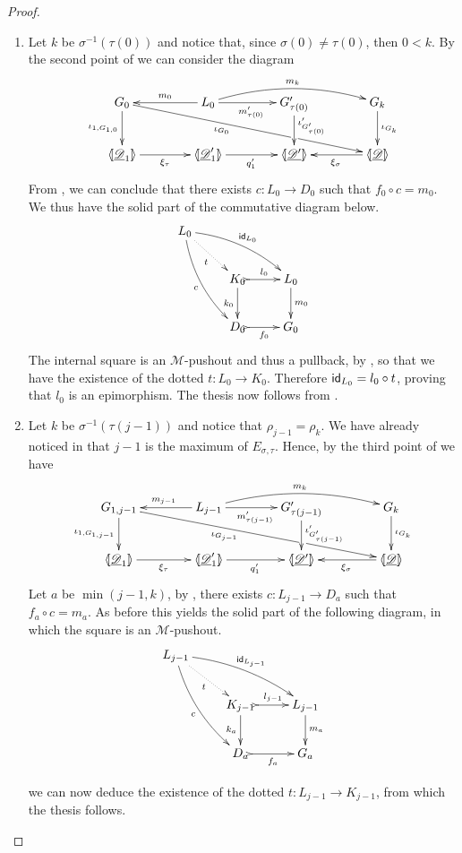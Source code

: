 \begin{proof}
	\begin{enumerate}
		\item Let $k$ be $\sigma^{-1}(\tau(0))$ and notice that, since $\sigma(0)\neq \tau(0)$, then $0< k$.  By  the second point of   we can consider the diagram
		\[\xymatrix@C=40pt{G_{0} \ar[drrr]_(.4){\iota_{G_0}}|(.675)\hole \ar[d]_{\iota_{1,G_{1,0}}}& L_0 \ar[r]_{m'_{\tau(0)}} \ar@/^.4cm/[rr]^{m_{k}} \ar[l]_{m_{0}} &G'_{\tau(0)} \ar[d]^(.45){\iota'_{G'_{\tau(0)}}} & G_{k} \ar[d]^{\iota_{G_k}}\\ \lpro\der{D}_1 \rpro \ar[r]_{\xi_{\tau}} &\lpro \der{D}'_1\rpro \ar[r]_{q'_1} & \lpro \der{D'}\rpro & \tpro{D} \ar[l]^{\xi_{\sigma}}}\]
		From , we can conclude that there exists $c\colon L_0\to D_0$ such that $f_0\circ c=m_0$. We thus have the solid part of the commutative diagram below.
		\[\xymatrix{L_0 \ar@/^.3cm/[drr]^{\id{L_0}} \ar@{.>}[dr]_{t} \ar@/_.3cm/[ddr]_{c}\\ & K_0 \ar[d]_{k_0}\ar@{>->}[r]^{l_0}& L_0 \ar[d]^{m_0} \\& D_0 \ar@{>->}[r]_{f_0} & G_0} \]
		The internal square is an $\mathcal{M}$-pushout and thus a pullback, by , so that we have the existence of the dotted $t\colon L_0\to K_0$. Therefore $\mathsf{id}_{L_0}=l_0\circ t$, proving that $l_0$ is an epimorphism. The thesis now follows from . 
		\item  Let $k$ be $\sigma^{-1}(\tau(j-1))$ and notice that $\rho_{j-1}=\rho_k$. We have already noticed in  that $j-1$ is the maximum of $E_{\sigma, \tau}$.  Hence, by the third point of  we have
		\[\xymatrix@C=40pt{G_{1,{j-1}} \ar[drrr]_(.4){\iota_{G_{j-1}}}|(.675)\hole \ar[d]_{\iota_{1,G_{1,j-1}}}& L_{j-1} \ar[r]_{m'_{\tau({j-1})}} \ar@/^.4cm/[rr]^{m_{k}} \ar[l]_{m_{{j-1}}} &G'_{\tau({j-1})} \ar[d]^{\iota'_{G'_{\tau({j-1})}}} & G_{k} \ar[d]^{\iota_{G_k}}\\ \lpro\der{D}_1 \rpro \ar[r]_{\xi_{\tau}} &\lpro \der{D}'_1\rpro \ar[r]_{q'_1} & \lpro \der{D'}\rpro & \tpro{D} \ar[l]^{\xi_{\sigma}}}\]
		Let $a$ be $\min(j-1, k)$, by ,  there exists $c\colon L_{j-1}\to D_a$ such that $f_a\circ c=m_a$. As before this yields the solid part of the following diagram, in which the square is an $\mathcal{M}$-pushout.
		\[\xymatrix{L_{j-1} \ar@/^.3cm/[drr]^{\id{L_{j-1}}} \ar@{.>}[dr]_{t} \ar@/_.3cm/[ddr]_{c}\\ & K_{j-1} \ar[d]_{k_a}\ar@{>->}[r]^{l_{j-1}}& L_{j-1} \ar[d]^{m_a} \\& D_a \ar@{>->}[r]_{f_a} & G_a} \]

	 we can now deduce the existence of the dotted $t\colon L_{j-1}\to K_{j-1}$, from which the thesis  follows. \qedhere
	\end{enumerate}
\end{proof}


